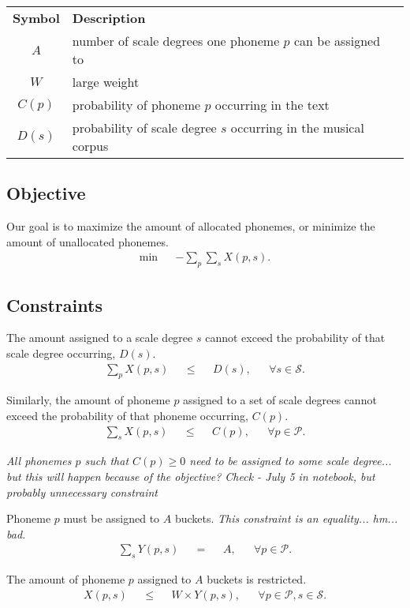 \begin{tabular}{c l l}
\textbf{Symbol} & \textbf{Description} \\
$A$ & number of scale degrees one phoneme $p$ can be assigned to\\
$W$ & large weight\\
$C(p)$ & probability of phoneme $p$ occurring in the text\\
$D(s)$ & probability of scale degree $s$ occurring in the musical corpus\\
\end{tabular}

\subsection{Objective}
Our goal is to maximize the amount of allocated phonemes, or minimize the amount of unallocated phonemes. 
\begin{align}
\min && -\sum_p \sum_s X(p,s).
\end{align}
\subsection{Constraints}
The amount assigned to a scale degree $s$ cannot exceed the probability of that scale degree occurring, $D(s)$.
\begin{align}
\sum_p X(p,s) && \leq && D(s) , && \forall s\in \mathcal{S}.
\end{align}

Similarly, the amount of phoneme $p$ assigned to a set of scale degrees cannot exceed the probability of that phoneme occurring, $C(p)$.
\begin{align}
\sum_s X(p,s) && \leq && C(p), && \forall p\in \mathcal{P}.
\end{align}

\textit{All phonemes $p$ such that $C(p)\geq 0$ need to be assigned to some scale degree... but this will happen because of the objective? Check - July 5 in notebook, but probably unnecessary constraint  }

Phoneme $p$ must be assigned to $A$ buckets. \textit{This constraint is an equality... hm... bad. }
\begin{align}
\sum_s Y(p,s) && = && A, && \forall p\in \mathcal{P}.
\end{align}

The amount of phoneme $p$ assigned to $A$ buckets is restricted.
\begin{align}
X(p,s) && \leq && W \times Y(p,s), && \forall p \in \mathcal{P}, s \in \mathcal{S}.
\end{align}

